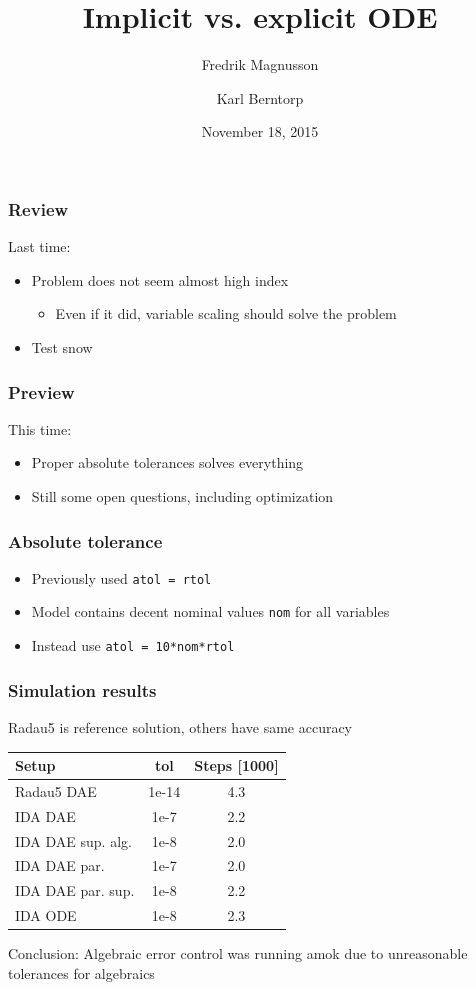 \documentclass[]{beamer}
\title{Implicit vs. explicit ODE}
\author{Fredrik Magnusson\inst{1} \and Karl Berntorp\inst{2}}
\institute
{
\inst{1} Department of Automatic Control \\
Lund University, Sweden \\
\vspace{14pt}
\inst{2} Mitsubishi Electric Research Laboratories \\
Cambridge, MA \\
\vspace{14pt}
\insertdate
}
\date{November 18, 2015}
\begin{document}
{
\begin{frame}[noframenumbering]
    \titlepage
\end{frame}
}

\begin{frame}
\frametitle{Review}
Last time:
\begin{itemize}
\item
Problem does not seem almost high index
\begin{itemize}
\item
Even if it did, variable scaling should solve the problem
\end{itemize}
\item
Test snow
\end{itemize}
\end{frame}

\begin{frame}
\frametitle{Preview}
This time:
\begin{itemize}
\item
Proper absolute tolerances solves everything
\item
Still some open questions, including optimization
\end{itemize}
\end{frame}

\begin{frame}[fragile]
\frametitle{Absolute tolerance}
\begin{itemize}
\item
Previously used \verb|atol = rtol|
\item
Model contains decent nominal values \verb|nom| for all variables
\item
Instead use \verb|atol = 10*nom*rtol|
\end{itemize}
\end{frame}

\begin{frame}
\frametitle{Simulation results}
Radau5 is reference solution, others have same accuracy

{\small
\begin{table}
\centering
\begin{tabular}{lcc}
\toprule
Setup & tol & Steps [1000] \\
\midrule
Radau5 DAE & 1e-14 & 4.3 \\
IDA DAE & 1e-7 & 2.2 \\
IDA DAE sup. alg. & 1e-8 & 2.0 \\
IDA DAE par. & 1e-7 & 2.0 \\
IDA DAE par. sup. & 1e-8 & 2.2 \\
IDA ODE & 1e-8 & 2.3 \\
\bottomrule
\end{tabular}
\end{table}
}

Conclusion: Algebraic error control was running amok due to unreasonable tolerances for algebraics
\end{frame}
\end{document}
